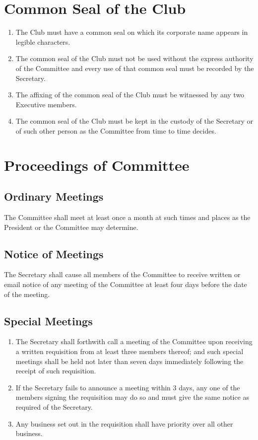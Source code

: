 \documentclass[11pt]{article} %
\begin{document}
\section{Common Seal of the Club}
\begin{enumerate}
	\item The Club must have a common seal on which its corporate name appears in legible characters.
	\item The common seal of the Club must not be used without the express authority of the Committee and every use of that common seal must be recorded by the Secretary.
	\item The affixing of the common seal of the Club must be witnessed by any two Executive members.
	\item The common seal of the Club must be kept in the custody of the Secretary or of such other person as the Committee from time to time decides.
\end{enumerate}

\section{Proceedings of Committee}
\subsection{Ordinary Meetings}
The Committee shall meet at least once a month at such times and places as the President or the Committee may determine.
\subsection{Notice of Meetings}
The Secretary shall cause all members of the Committee to receive written or email notice of any meeting of the Committee at least four days before the date of the meeting.
\subsection{Special Meetings}
\begin{enumerate}
	\item The Secretary shall forthwith call a meeting of the Committee upon receiving a written requisition from at least three members thereof; and such special meetings shall be held not later than seven days immediately following the receipt of such requisition.
	\item If the Secretary fails to announce a meeting within 3 days, any one of the members signing the requisition may do so and must give the same notice as required of the Secretary.
	\item Any business set out in the requisition shall have priority over all other business.
\end{enumerate}
\end{document}
